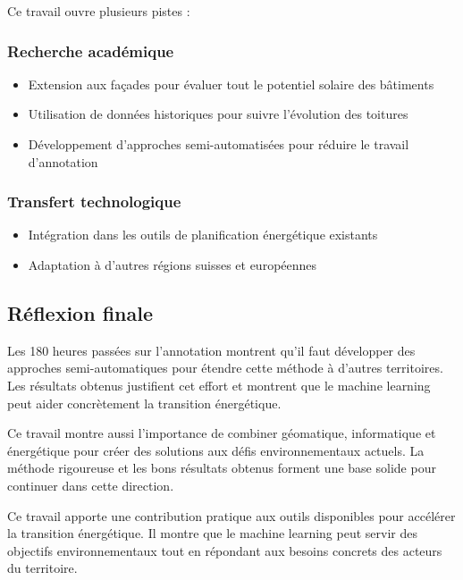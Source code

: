 Ce travail ouvre plusieurs pistes :

\subsubsection{Recherche académique}
\begin{itemize}
    \item Extension aux façades pour évaluer tout le potentiel solaire des bâtiments
    \item Utilisation de données historiques pour suivre l'évolution des toitures
    \item Développement d'approches semi-automatisées pour réduire le travail d'annotation
\end{itemize}

\subsubsection{Transfert technologique}
\begin{itemize}
    \item Intégration dans les outils de planification énergétique existants
    \item Adaptation à d'autres régions suisses et européennes
\end{itemize}

\subsection{Réflexion finale}

Les 180 heures passées sur l'annotation montrent qu'il faut développer des approches semi-automatiques pour étendre cette méthode à d'autres territoires. Les résultats obtenus justifient cet effort et montrent que le machine learning peut aider concrètement la transition énergétique.

Ce travail montre aussi l'importance de combiner géomatique, informatique et énergétique pour créer des solutions aux défis environnementaux actuels. La méthode rigoureuse et les bons résultats obtenus forment une base solide pour continuer dans cette direction.

Ce travail apporte une contribution pratique aux outils disponibles pour accélérer la transition énergétique. Il montre que le machine learning peut servir des objectifs environnementaux tout en répondant aux besoins concrets des acteurs du territoire.
